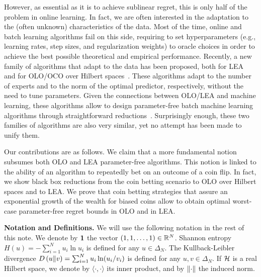 However, as essential as it is to achieve sublinear regret, this is only half
of the problem in online learning. In fact, we are often interested in the
adaptation to the (often unknown) characteristics of the data. Most of the
time, online and batch learning algorithms fail on this side, requiring to set
hyperparameters (e.g., learning rates, step sizes, and regularization weights)
to oracle choices in order to achieve the best possible theoretical and
empirical performance. Recently, a new family of algorithms that adapt to the
data has been proposed, both for \ac{LEA}~\citep{Chaudhuri-Freund-Hsu-2009,
Chernov-Vovk-2010, Luo-Schapire-2014, Luo-Schapire-2015, Koolen-van-Erven-2015}
and for \ac{OLO}/\ac{OCO} over Hilbert spaces~\citep{Streeter-McMahan-2012,
Orabona-2013, McMahan-Abernethy-2013, McMahan-Orabona-2014, Orabona-2014}.
These algorithms adapt to the number of experts and to the norm of the optimal
predictor, respectively, without the need to tune parameters. Given the
connections between \ac{OLO}/\ac{LEA} and machine learning, these algorithms
allow to design parameter-free batch machine learning algorithms through
straightforward reductions~\citep{Orabona-2014,Luo-Schapire-2015}.
Surprisingly enough, these two families of algorithms are also very similar,
yet no attempt has been made to unify them.

Our contributions are as follows. We claim that a more fundamental notion
subsumes both \ac{OLO} and \ac{LEA} parameter-free algorithms. This notion is
linked to the ability of an algorithm to repeatedly bet on an outcome of a coin
flip. In fact, we show black
box reductions from the coin betting scenario to \ac{OLO} over Hilbert spaces
and to \ac{LEA}.  We prove that coin betting strategies
that assure an exponential growth of the wealth for biased coins allow to
obtain optimal worst-case parameter-free regret bounds in \ac{OLO} and in
\ac{LEA}.

\noindent\textbf{Notation and Definitions.} We will use the following notation
in the rest of this note. We denote by $\mathbf{1}$ the vector $(1,1,\dots,1)
\in \mathbb{R}^N$. Shannon entropy $H(u) = -\sum_{i=1}^N u_i \ln u_i$ is defined for
any $u \in \Delta_N$.  The Kullback-Leibler divergence $D\left({u}\middle\|{v}\right) =
\sum_{i=1}^N u_i \ln(u_i/v_i)$ is defined for any $u,v \in \Delta_N$. If $\mathcal{H}$
is a real Hilbert space, we denote by $\langle \cdot, \cdot \rangle$ its inner
product, and by $\left\|{\cdot}\right\|$ the induced norm.
